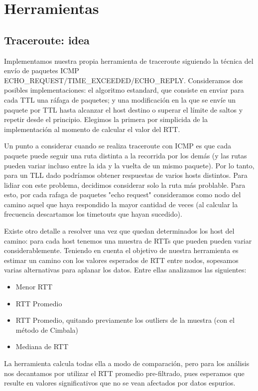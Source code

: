 \section{Herramientas}

\subsection{Traceroute: idea}

Implementamos nuestra propia herramienta de traceroute siguiendo la técnica del envío de paquetes ICMP ECHO\_REQUEST/TIME\_EXCEEDED/ECHO\_REPLY. Consideramos dos posibles implementaciones: el algoritmo estandard, que consiste en enviar para cada TTL una ráfaga de paquetes; y una modificación en la que se envíe un paquete por TTL hasta alcanzar el host destino o superar el límite de saltos y repetir desde el principio. Elegimos la primera por simplicida de la implementación al momento de calcular el valor del RTT.

Un punto a considerar cuando se realiza traceroute con ICMP es que cada paquete puede seguir una ruta distinta a la recorrida por los demás (y las rutas  pueden variar incluso entre la ida y la vuelta de un mismo paquete). Por lo tanto, para un TLL dado podríamos obtener respuestas de varios hosts distintos. Para lidiar con este problema, decidimos considerar solo la ruta más problable. Para esto, por cada rafaga de paquetes "echo request" consideramos como nodo del camino aquel que haya respondido la mayor cantidad de veces (al calcular la frecuencia descartamos los timetouts que hayan sucedido).

Existe otro detalle a resolver una vez que quedan determinados los host del camino: para cada host tenemos una muestra de RTTs que pueden  pueden variar considerablemente. Teniendo en cuenta el objetivo de nuestra herramienta es estimar un camino con los valores esperados de RTT entre nodos, sopesamos varias alternativas para aplanar los datos. Entre ellas analizamos las siguientes:
\begin{itemize}
\item{Menor RTT}
\item{RTT Promedio}
\item{RTT Promedio, quitando previamente los outliers de la muestra (con el método de Cimbala)}
\item{Mediana de RTT}
\end{itemize}
La herramienta calcula todas ella a modo de comparación, pero para los análisis nos decantamos por utilizar el RTT promedio pre-filtrado, pues esperamos que resulte en valores significativos que no se vean afectados por datos espurios. 


